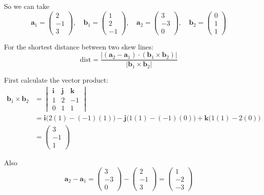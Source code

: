 \documentclass[leqno]{article}
\begin{document}
\begin{enumerate}[
  label=\textbf{\arabic*.},
  leftmargin=*,
  topsep=0pt,
  partopsep=0pt,
  parsep=0pt
]
\begin{djsSolution}
\begin{enumerate}[label=\textbf{(\roman*)}]
  So we can take
  \[
  \mathbf a_1=\begin{pmatrix}2\\-1\\3\end{pmatrix},\quad
  \mathbf b_1=\begin{pmatrix}1\\2\\-1\end{pmatrix},\quad
  \mathbf a_2=\begin{pmatrix}3\\-3\\0\end{pmatrix},\quad
  \mathbf b_2=\begin{pmatrix}0\\1\\1\end{pmatrix}
  \]

  For the shortest distance between two skew lines:
  \[
  \mathrm{dist}
  =\frac{\left\lvert(\mathbf a_2-\mathbf a_1)\cdot(\mathbf b_1\times\mathbf b_2)\right\rvert}
  {\left\lvert\mathbf b_1\times\mathbf b_2\right\rvert}
  \]

  First calculate the vector product:
  \begin{align*}
  \mathbf b_1\times\mathbf b_2
  &=\begin{vmatrix}
  \mathbf i & \mathbf j & \mathbf k\\
  1 & 2 & -1\\
  0 & 1 & 1
  \end{vmatrix}\\
  &=\mathbf i\bigl(2(1)-(-1)(1)\bigr)-\mathbf j\bigl(1(1)-(-1)(0)\bigr)+\mathbf k\bigl(1(1)-2(0)\bigr)\\
  &=\begin{pmatrix}3\\-1\\1\end{pmatrix}
  \end{align*}

  Also
  \[
  \mathbf a_2-\mathbf a_1
  =\begin{pmatrix}3\\-3\\0\end{pmatrix}-\begin{pmatrix}2\\-1\\3\end{pmatrix}
  =\begin{pmatrix}1\\-2\\-3\end{pmatrix}
  \]


\end{enumerate}
\end{djsSolution}
\end{enumerate}
\end{document}
